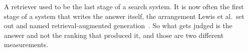 %
%
%
%

A retriever used to be the last stage of a search system. It is now often the first
stage of a system that writes the answer itself, the arrangement Lewis et al.\ set out
and named retrieval-augmented generation~\cite{lewis2020rag}. So what gets judged is the
answer and not the ranking that produced it, and those are two different measurements.


